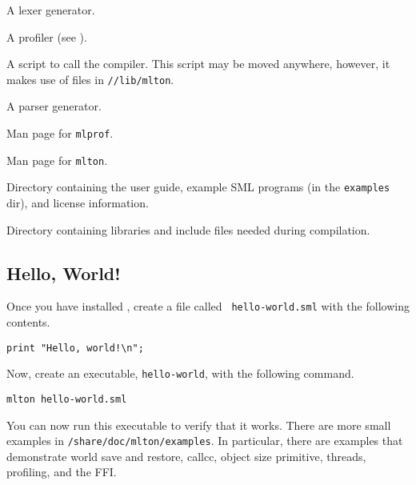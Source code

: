 \begin{description}

A lexer generator.

A profiler (see ).

A script to call the compiler.
This script may be moved anywhere, however,
it makes use of files in {\tt /\prefix/lib/mlton}.

A parser generator.

Man page for {\tt mlprof}.

Man page for {\tt mlton}.


Directory containing the user guide, example SML programs (in the {\tt examples}
dir), and license information.

Directory containing libraries and include files needed during
compilation.

\end{description}

\subsection{Hello, World!}

Once you have installed {\mlton}, create a file called {\tt
hello-world.sml} with the following contents.

\begin{verbatim}
print "Hello, world!\n";
\end{verbatim}
Now, create an executable, {\tt hello-world}, with the following command.
\begin{verbatim}
mlton hello-world.sml
\end{verbatim}
You can now run this executable to verify that it works.  There are
more small examples in {\tt \prefix/share/doc/mlton/examples}.  In
particular, there are examples that demonstrate world save and
restore, callcc, object size primitive, threads, profiling, and the
FFI.
